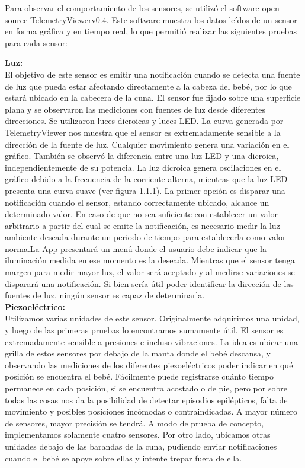 \documentclass{IEEEtran}
\begin{document}
Para observar el comportamiento de los sensores, se utilizó el software open-source TelemetryViewerv0.4. Este software muestra los datos leídos de un sensor en forma gráfica y en tiempo real, lo que permitió realizar las siguientes pruebas para cada sensor:

\textbf{Luz:} \\ 
El objetivo de este sensor es emitir una notificación cuando se detecta una fuente de luz que pueda estar afectando directamente a la cabeza del bebé, por lo que estará ubicado en la cabecera de la cuna.
El sensor fue fijado sobre una superficie plana y se observaron las mediciones con fuentes de luz desde diferentes direcciones. Se utilizaron luces dicroicas y luces LED. 
La curva generada por TelemetryViewer nos muestra que el sensor es extremadamente sensible a la dirección de la fuente de luz. Cualquier movimiento genera una variación en el gráfico. También se observó la diferencia entre una luz LED y una dicroica, independientemente de su potencia. La luz dicroica genera oscilaciones en el gráfico debido a la frecuencia de la corriente alterna, mientras que la luz LED presenta una curva suave (ver figura 1.1.1). 
La primer opción es disparar una notificación cuando el sensor, estando correctamente ubicado, alcance un determinado valor.
En caso de que no sea suficiente con establecer un valor arbitrario a partir del cual se emite la notificación, es necesario medir la luz ambiente deseada durante un periodo de tiempo para establecerla como valor norma.La App presentará un menú donde el usuario debe indicar que la iluminación medida en ese momento es la deseada. Mientras que el sensor tenga margen para medir mayor luz, el valor será aceptado y al medirse variaciones se disparará una notificación.
Si bien sería útil poder identificar la dirección de las fuentes de luz, ningún sensor es capaz de determinarla.\\

\textbf{Piezoeléctrico:}\\
Utilizamos varias unidades de este sensor. Originalmente adquirimos una unidad, y luego de las primeras pruebas lo encontramos sumamente útil. El sensor es extremadamente sensible a presiones e incluso vibraciones. La idea es ubicar una grilla de estos sensores por debajo de la manta donde el bebé descansa, y observando las mediciones de los diferentes piezoeléctricos poder indicar en qué posición se encuentra el bebé. Fácilmente puede registrarse cuánto tiempo permanece en cada posición, si se encuentra acostado o de pie, pero por sobre todas las cosas nos da la posibilidad de detectar episodios epilépticos, falta de movimiento y posibles posiciones incómodas o contraindicadas. A mayor número de sensores, mayor precisión se tendrá. A modo de prueba de concepto, implementamos solamente cuatro sensores.
Por otro lado, ubicamos otras unidades debajo de las barandas de la cuna, pudiendo enviar notificaciones cuando el bebé se apoye sobre ellas y intente trepar fuera de ella.\\
\end{document}
